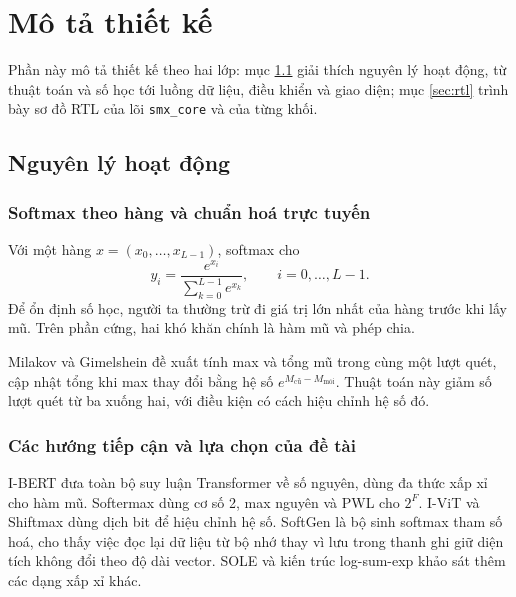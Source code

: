 \section{Mô tả thiết kế}

Phần này mô tả thiết kế theo hai lớp: mục \ref{sec:principle} giải thích nguyên lý hoạt động, từ thuật toán và số học tới luồng dữ liệu, điều khiển và giao diện; mục \ref{sec:rtl} trình bày sơ đồ RTL của lõi \texttt{smx\_core} và của từng khối.

\subsection{Nguyên lý hoạt động}
\label{sec:principle}

\subsubsection{Softmax theo hàng và chuẩn hoá trực tuyến}
\label{sec:softmax}

Với một hàng $x = (x_0, \dots, x_{L-1})$, softmax cho
\begin{equation}
  y_i = \frac{e^{x_i}}{\sum_{k=0}^{L-1} e^{x_k}}, \qquad i = 0, \dots, L-1.
\end{equation}
Để ổn định số học, người ta thường trừ đi giá trị lớn nhất của hàng trước khi lấy mũ. Trên phần cứng, hai khó khăn chính là hàm mũ và phép chia.

Milakov và Gimelshein \cite{milakov2018} đề xuất tính max và tổng mũ trong cùng một lượt quét, cập nhật tổng khi max thay đổi bằng hệ số $e^{M_{\text{cũ}}-M_{\text{mới}}}$. Thuật toán này giảm số lượt quét từ ba xuống hai, với điều kiện có cách hiệu chỉnh hệ số đó.

\subsubsection{Các hướng tiếp cận và lựa chọn của đề tài}
\label{sec:choice}

I-BERT \cite{kim2021ibert} đưa toàn bộ suy luận Transformer về số nguyên, dùng đa thức xấp xỉ cho hàm mũ. Softermax \cite{stevens2021softermax} dùng cơ số 2, max nguyên và PWL cho $2^{F}$. I-ViT và Shiftmax \cite{li2023ivit} dùng dịch bit để hiệu chỉnh hệ số. SoftGen \cite{wei2020softgen} là bộ sinh softmax tham số hoá, cho thấy việc đọc lại dữ liệu từ bộ nhớ thay vì lưu trong thanh ghi giữ diện tích không đổi theo độ dài vector. SOLE \cite{wang2025sole} và kiến trúc log-sum-exp \cite{wang2018lse} khảo sát thêm các dạng xấp xỉ khác.

